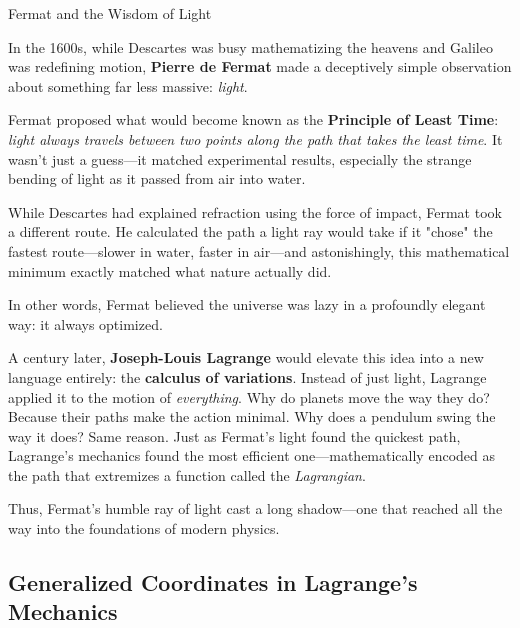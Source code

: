 \begin{HistoricalSidebar}{Fermat and the Wisdom of Light}

    In the 1600s, while Descartes was busy mathematizing the heavens and Galileo was redefining motion, \textbf{Pierre de Fermat} made a deceptively simple observation about something far less massive: \emph{light}.

    \medskip
    
    Fermat proposed what would become known as the \textbf{Principle of Least Time}: \emph{light always travels between two points along the path that takes the least time}. It wasn’t just a guess—it matched experimental results, especially the strange bending of light as it passed from air into water.

    \medskip
    
    While Descartes had explained refraction using the force of impact, Fermat took a different route. He calculated the path a light ray would take if it "chose" the fastest route—slower in water, faster in air—and astonishingly, this mathematical minimum exactly matched what nature actually did.

    \medskip
    
    In other words, Fermat believed the universe was lazy in a profoundly elegant way: it always optimized.
    
    \medskip
    
    A century later, \textbf{Joseph-Louis Lagrange} would elevate this idea into a new language entirely: the \textbf{calculus of variations}. Instead of just light, Lagrange applied it to the motion of \emph{everything}. Why do planets move the way they do? Because their paths make the action minimal. Why does a pendulum swing the way it does? Same reason. Just as Fermat’s light found the quickest path, Lagrange’s mechanics found the most efficient one—mathematically encoded as the path that extremizes a function called the \textit{Lagrangian}.

    \medskip
    
    Thus, Fermat’s humble ray of light cast a long shadow—one that reached all the way into the foundations of modern physics.
    
\end{HistoricalSidebar}

   





\subsection{Generalized Coordinates in Lagrange’s Mechanics}

